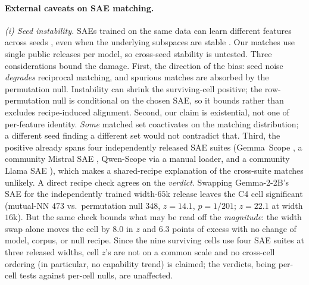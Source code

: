 \paragraph{External caveats on SAE matching.}
\emph{(i) Seed instability.} SAEs trained on the same data can learn different features
across seeds \citep{paulo2025sae}, even when the
underlying subspaces are stable \citep{gerasimov2026unstable}. Our matches use single
public releases per model, so cross-seed stability is untested. Three considerations bound
the damage. First, the direction of the bias: seed noise \emph{degrades} reciprocal
matching, and spurious matches are absorbed by the permutation null. Instability can shrink
the surviving-cell positive; the row-permutation null is conditional on the chosen SAE, so
it bounds rather than excludes recipe-induced alignment. Second, our claim is existential, not
one of per-feature identity. \emph{Some} matched set coactivates on the matching distribution; a
different seed finding a different set would not contradict that.
Third, the positive already spans four independently released SAE suites
(Gemma~Scope \citep{lieberum2024gemmascope}, a community Mistral SAE \citep{engels2024mistralsae}, Qwen-Scope \citep{qwenscope2026} via a manual loader, and a community Llama SAE \citep{chanind2024llamasae}), which makes a
shared-recipe explanation of the cross-suite matches unlikely.
A direct recipe check agrees on the \emph{verdict}. Swapping Gemma-2-2B's SAE for the
independently trained
width-$65$k release leaves the C4 cell significant (mutual-NN $473$ vs.\
permutation null $348$, $z=14.1$, $p=1/201$; $z=22.1$ at width $16$k). But the same check
bounds what may be read off the \emph{magnitude}: the width swap alone moves the cell by
$8.0$ in $z$ and $6.3$ points of excess with no change of model, corpus, or null
recipe. Since the nine surviving cells use four SAE suites at three released widths, cell $z$'s
are not on a common scale and no cross-cell ordering (in particular, no capability trend)
is claimed; the verdicts, being per-cell tests against per-cell nulls, are unaffected.

